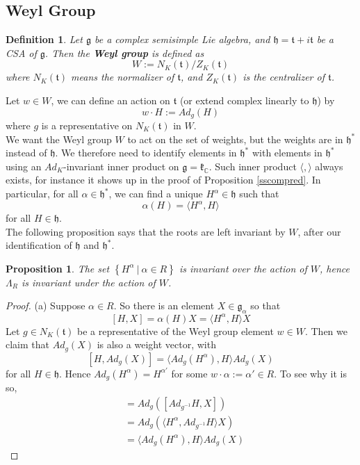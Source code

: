 \documentclass[11pt]{article}
\newtheorem{proposition}[theorem]{Proposition}
\newtheorem{definition}[theorem]{Definition}
\newcommand{\bb}[1]{\mathbb{#1}}
\newcommand{\mf}[1]{\mathfrak{#1}}
\begin{document}
\subsection{Weyl Group}
\begin{definition}
Let $\mf{g}$ be a complex semisimple Lie algebra, and $\mf{h} = \mf{t} + i\mf{t}$ be a CSA of $\mf{g}$. Then the \textbf{Weyl group} is defined as
$$W := N_K(\mf{t})/Z_K(\mf{t})$$
where $N_K(\mf{t})$ means the normalizer of $\mf{t}$, and $Z_K(\mf{t})$ is the centralizer of $\mf{t}$.
\end{definition}
Let $w \in W$, we can define an action on $\mf{t}$ (or extend complex linearly to $\mf{h}$) by
$$w \cdot H := Ad_g(H)$$
where $g$ is a representative on $N_K(\mf{t})$ in $W$.\\

We want the Weyl group $W$ to act on the set of weights, but the weights are in $\mf{h}^*$ instead of $\mf{h}$. We therefore need to identify elements in $\mf{h}^*$ with elements in $\mf{h}^*$ using an $Ad_K$-invariant inner product on $\mf{g} = \mf{k}_{\bb{C}}$. Such inner product $\langle, \rangle$ always exists, for instance it shows up in the proof of Proposition \ref{sscompred}. In particular, for all $\alpha \in \mf{h}^*$, we can find a unique $H^{\alpha} \in \mf{h}$ such that
$$\alpha(H) = \langle H^{\alpha},H\rangle$$
for all $H \in \mf{h}$.\\
The following proposition says that the roots are left invariant by $W$, after our identification of $\mf{h}$ and $\mf{h}^*$.
\begin{proposition}
The set $\left\{ H^{\alpha}\ \Big|\ \alpha \in R\right\}$ is invariant over the action of $W$, hence $\Lambda_R$ is invariant under the action of $W$.
\end{proposition}
\begin{proof}
(a) Suppose $\alpha \in R$. So there is an element $X \in \mf{g}_{\alpha}$ so that
$$[H,X] = \alpha(H)X = \langle H^{\alpha}, H\rangle X$$
Let $g \in N_K(\mf{t})$ be a representative of the Weyl group element $w \in W$. Then we claim that $Ad_g(X)$ is also a weight vector, with
$$[H, Ad_g(X)] = \langle Ad_g(H^{\alpha}), H \rangle Ad_g(X)$$
for all $H \in \mf{h}$. Hence $Ad_g(H^{\alpha}) = H^{\alpha'}$ for some $w\cdot \alpha := \alpha' \in R$. To see why it is so,
\begin{align*}
[H,Ad_g(X)] &= Ad_g([Ad_{g^{-1}}H, X])\\
&=Ad_g(\langle H^{\alpha}, Ad_{g^{-1}}H \rangle X)\\
&=\langle Ad_g(H^{\alpha}), H \rangle Ad_g(X)
\end{align*}
\end{proof}
\end{document}
